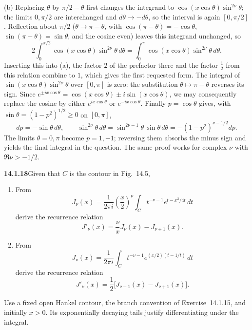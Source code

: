 (b) Replacing $\theta$ by $\pi/2-\theta$ first changes the integrand
to $\cos(x\cos\theta)\sin^{2\nu}\theta$; the limits $0,\pi/2$ are
interchanged and $d\theta\to-d\theta$, so the interval is again
$[0,\pi/2]$. Reflection about $\pi/2$ ($\theta\to\pi-\theta$, with
$\cos(\pi-\theta)=-\cos\theta$, $\sin(\pi-\theta)=\sin\theta$, and
the cosine even) leaves this integrand unchanged, so
\[
2\int_0^{\pi/2}\cos(x\cos\theta)\sin^{2\nu}\theta\,d\theta
=\int_0^\pi\cos(x\cos\theta)\sin^{2\nu}\theta\,d\theta.
\]
Inserting this into (a), the factor $2$ of the prefactor there and the
factor $\frac12$ from this relation combine to $1$, which gives the
first requested form. The integral of
$\sin(x\cos\theta)\sin^{2\nu}\theta$ over $[0,\pi]$ is zero: the
substitution $\theta\mapsto\pi-\theta$ reverses its sign. Since
$e^{\pm ix\cos\theta}=\cos(x\cos\theta)\pm i\sin(x\cos\theta)$, we may
consequently replace the cosine by either $e^{ix\cos\theta}$ or
$e^{-ix\cos\theta}$. Finally $p=\cos\theta$ gives, with
$\sin\theta=(1-p^2)^{1/2}\ge0$ on $[0,\pi]$,
\[
dp=-\sin\theta\,d\theta,\qquad
\sin^{2\nu}\theta\,d\theta=\sin^{2\nu-1}\theta\,\sin\theta\,d\theta
=-(1-p^2)^{\nu-1/2}dp.
\]
The limits $\theta=0,\pi$ become $p=1,-1$; reversing them absorbs the
minus sign and yields the final integral in the question.
The same proof works for complex $\nu$ with $\Re\nu>-1/2$.

\par\bigskip
\noindent\textbf{14.1.18}\quad Given that $C$ is the contour in
Fig.~14.5,
\begin{enumerate}
\item[(a)] From
\[
J_{\nu}(x)=\frac{1}{2\pi i}\left(\frac{x}{2}\right)^{\nu}
\int_{C}t^{-\nu-1}e^{t-x^{2}/4t}\,dt
\]
derive the recurrence relation
\[
J'_{\nu}(x)=\frac{\nu}{x}J_{\nu}(x)-J_{\nu+1}(x).
\]
\item[(b)] From
\[
J_{\nu}(x)=\frac{1}{2\pi i}\int_{C}t^{-\nu-1}e^{(x/2)(t-1/t)}\,dt
\]
derive the recurrence relation
\[
J'_{\nu}(x)=\frac{1}{2}\big[J_{\nu-1}(x)-J_{\nu+1}(x)\big].
\]
\end{enumerate}
\par{}
\solution
Use a fixed open Hankel contour, the branch convention of
Exercise~14.1.15, and initially $x>0$. Its exponentially decaying
tails justify differentiating under the integral.

